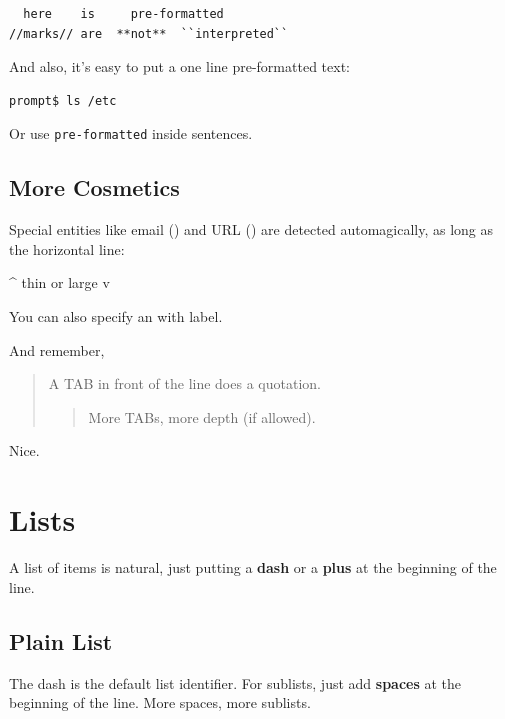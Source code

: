 \documentclass{article}
\begin{document}
\begin{verbatim}
  here    is     pre-formatted
//marks// are  **not**  ``interpreted``
\end{verbatim}

And also, it's easy to put a one line pre-formatted
text:

\begin{verbatim}
prompt$ ls /etc
\end{verbatim}

Or use \texttt{pre-formatted} inside sentences.

\subsection*{More Cosmetics}

Special entities like email () and
URL () are detected automagically,
as long as the horizontal line:

\hrulefill{}

\^{} thin or large v

\clearpage

You can also specify an 
with label.

And remember,

	\begin{quotation}
A TAB in front of the line does a quotation.
		\begin{quotation}
More TABs, more depth (if allowed).
		\end{quotation}
	\end{quotation}

Nice.

\section*{Lists}

A list of items is natural, just putting a \textbf{dash} or
a \textbf{plus} at the beginning of the line.

\subsection*{Plain List}

The dash is the default list identifier. For sublists,
just add \textbf{spaces} at the beginning of the line. More
spaces, more sublists.
\end{document}
